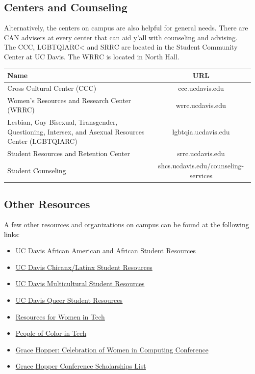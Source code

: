 \documentclass{article}
\begin{document}
\subsection{Centers and Counseling}
Alternatively, the centers on campus are also helpful for general needs. There
are CAN advisers at every center that can aid y'all with counseling and
advising. The CCC, LGBTQIARC< and SRRC are located in the Student Community
Center at UC Davis. The WRRC is located in North Hall.
\begin{center}
\begin{tabular} {p{8cm}c}
  \toprule
\textbf{Name} & \textbf{URL} \\
  \midrule
Cross Cultural Center (CCC) & ccc.ucdavis.edu \\
Women's Resources and Research Center (WRRC) & wrrc.ucdavis.edu\\
Lesbian, Gay Bisexual, Transgender, Questioning, Intersex, and Asexual Resources Center (LGBTQIARC) & lgbtqia.ucdavis.edu \\
Student Resources and Retention Center & srrc.ucdavis.edu \\
Student Counseling & shcs.ucdavis.edu/counseling-services \\
  \bottomrule
\end{tabular}
\end{center}

\subsection {Other Resources} 
A few other resources and organizations on campus can be found at the following links:
\begin{itemize}
\item \href{https://www.ucdavis.edu/admissions/undergraduate/community/african-american-student-resources/}{UC Davis African American and African Student Resources}
\item \href{https://www.ucdavis.edu/admissions/undergraduate/community/latino-chicano-organizations/}{UC Davis Chicanx/Latinx Student Resources}
\item \href{https://www.ucdavis.edu/admissions/undergraduate/community/}{UC Davis Multicultural Student Resources}
\item \href{http://lgbtqia.ucdavis.edu/connected/student-org.html}{UC Davis Queer Student Resources}
\item \href{https://github.com/cristianoliveira/awesome4girls}{Resources for Women in Tech}
\item \href{http://peopleofcolorintech.com/}{People of Color in Tech}
\item \href{http://ghc.anitaborg.org/}{Grace Hopper: Celebration of Women in Computing Conference}
\item \href{https://github.com/freialobo/GHC-Scholarships}{Grace Hopper Conference Scholarships List}
\end{itemize}
\newpage
{}
\label{glossary}

\end{document}
